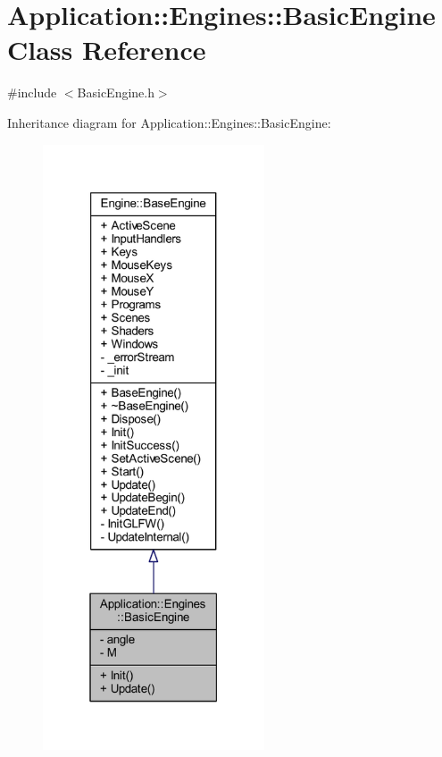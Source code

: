 \hypertarget{classApplication_1_1Engines_1_1BasicEngine}{}\section{Application\+:\+:Engines\+:\+:Basic\+Engine Class Reference}
\label{classApplication_1_1Engines_1_1BasicEngine}


{\ttfamily \#include $<$Basic\+Engine.\+h$>$}



Inheritance diagram for Application\+:\+:Engines\+:\+:Basic\+Engine\+:
\nopagebreak
\begin{figure}[H]
\begin{center}
\leavevmode
\includegraphics[width=186pt]{classApplication_1_1Engines_1_1BasicEngine__inherit__graph}
\end{center}
\end{figure}


